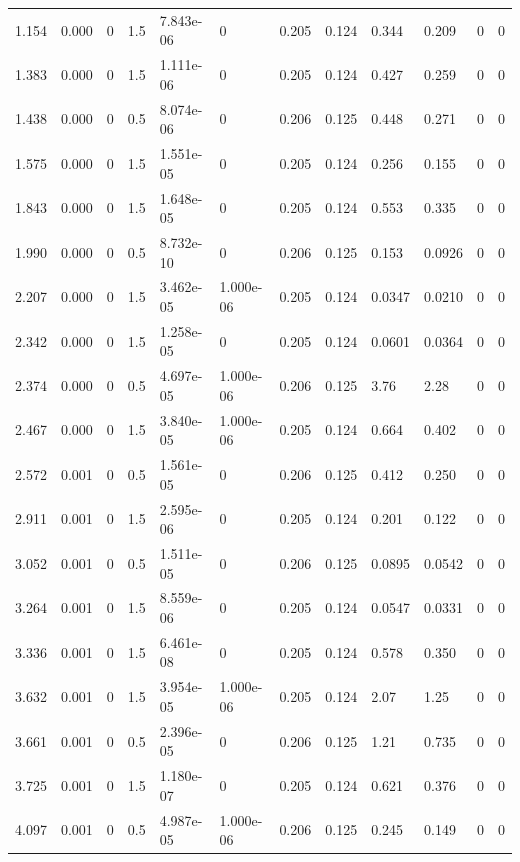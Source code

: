 \documentclass[preview]{standalone}
\begin{document}
{{\begin{tabular}{L{1.2cm}C{1.2cm} C{0.3cm}C{0.5cm} C{1.4cm}C{1.4cm} C{1.4cm}C{1.4cm} C{1.6cm}C{1.6cm} C{1.6cm}C{1.6cm}}
  1.154  &  0.000  & 0     & 1.5 &  7.843e-06  & 0  &  0.205&   0.124& 0.344 & 0.209   &  0 & 0  \\ 
  1.383  &  0.000  & 0     & 1.5 &  1.111e-06  & 0  &  0.205&   0.124& 0.427 & 0.259   &  0 & 0  \\ 
  1.438  &  0.000  & 0     & 0.5 &  8.074e-06  & 0  &  0.206&   0.125& 0.448 & 0.271   &  0 & 0  \\ 
  1.575  &  0.000  & 0     & 1.5 &  1.551e-05  & 0  &  0.205&   0.124& 0.256 & 0.155   &  0 & 0  \\ 
  1.843  &  0.000  & 0     & 1.5 &  1.648e-05  & 0  &  0.205&   0.124& 0.553 & 0.335   &  0 & 0  \\ 
  1.990  &  0.000  & 0     & 0.5 &  8.732e-10  & 0  &  0.206&   0.125& 0.153 & 0.0926   &  0 & 0  \\ 
  2.207  &  0.000  & 0     & 1.5 &  3.462e-05  & 1.000e-06  &  0.205&   0.124& 0.0347 & 0.0210   &  0 & 0  \\ 
  2.342  &  0.000  & 0     & 1.5 &  1.258e-05  & 0  &  0.205&   0.124& 0.0601 & 0.0364   &  0 & 0  \\ 
  2.374  &  0.000  & 0     & 0.5 &  4.697e-05  & 1.000e-06  &  0.206&   0.125& 3.76 & 2.28   &  0 & 0  \\ 
  2.467  &  0.000  & 0     & 1.5 &  3.840e-05  & 1.000e-06  &  0.205&   0.124& 0.664 & 0.402   &  0 & 0  \\ 
  2.572  &  0.001  & 0     & 0.5 &  1.561e-05  & 0  &  0.206&   0.125& 0.412 & 0.250   &  0 & 0  \\ 
  2.911  &  0.001  & 0     & 1.5 &  2.595e-06  & 0  &  0.205&   0.124& 0.201 & 0.122   &  0 & 0  \\ 
  3.052  &  0.001  & 0     & 0.5 &  1.511e-05  & 0  &  0.206&   0.125& 0.0895 & 0.0542   &  0 & 0  \\ 
  3.264  &  0.001  & 0     & 1.5 &  8.559e-06  & 0  &  0.205&   0.124& 0.0547 & 0.0331   &  0 & 0  \\ 
  3.336  &  0.001  & 0     & 1.5 &  6.461e-08  & 0  &  0.205&   0.124& 0.578 & 0.350   &  0 & 0  \\ 
  3.632  &  0.001  & 0     & 1.5 &  3.954e-05  & 1.000e-06  &  0.205&   0.124& 2.07 & 1.25   &  0 & 0  \\ 
  3.661  &  0.001  & 0     & 0.5 &  2.396e-05  & 0  &  0.206&   0.125& 1.21 & 0.735   &  0 & 0  \\ 
  3.725  &  0.001  & 0     & 1.5 &  1.180e-07  & 0  &  0.205&   0.124& 0.621 & 0.376   &  0 & 0  \\ 
  4.097  &  0.001  & 0     & 0.5 &  4.987e-05  & 1.000e-06  &  0.206&   0.125& 0.245 & 0.149   &  0 & 0  \\ 

\end{tabular}}}
\end{document}
